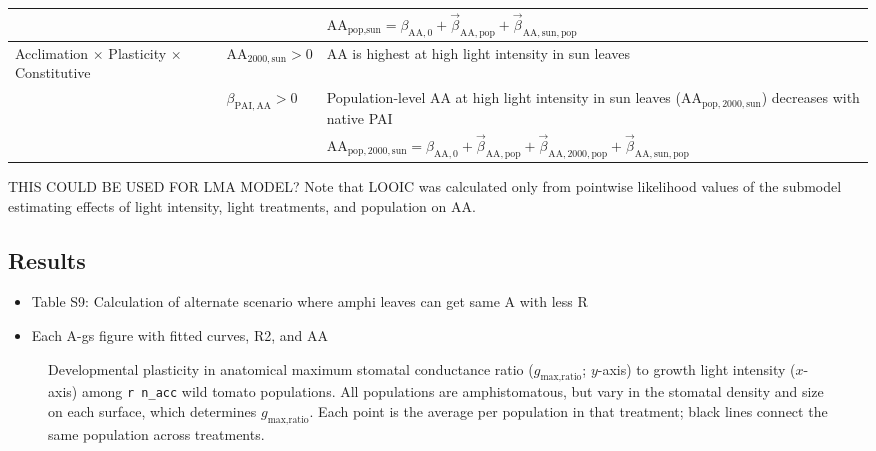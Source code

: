 \documentclass[
  letterpaper,
  DIV=11,
  numbers=noendperiod]{scrartcl}
\providecommand{\tightlist}{%
  \setlength{\itemsep}{0pt}\setlength{\parskip}{0pt}}\usepackage{longtable,booktabs,array}
\newcommand{\aax}{$\mathrm{AA}$}
\newcommand{\gmaxratio}{$g_\text{max,ratio}$}
\begin{document}
\begin{longtable}{>{\raggedright\arraybackslash}p{1in}>{\raggedright\arraybackslash}p{1.5in}>{\raggedright\arraybackslash}p{3in}}
\nopagebreak
 &  & \hspace{-1em}$\mathrm{AA}_{\text{pop},\text{sun}} = \beta_{\mathrm{AA}, 0} + \vec{\beta}_{\mathrm{AA}, \text{pop}} + \vec{\beta}_{\mathrm{AA}, \text{sun}, \text{pop}}$\\
\cmidrule{1-3}\pagebreak[0]
Acclimation $\times$ Plasticity $\times$ Constitutive & $\mathrm{AA}_{2000,\text{sun}} > 0$ & \hspace{-1em}\aax{} is highest at high light intensity in sun leaves\\
\nopagebreak
 & $\beta_{\mathrm{PAI,AA}} > 0$ & \hspace{-1em}Population-level \aax{} at high light intensity in sun leaves ($\mathrm{AA}_{\text{pop},2000,\text{sun}}$) decreases with native PAI\\
\nopagebreak
 &  & \hspace{-1em}$\mathrm{AA}_{\text{pop},2000,\text{sun}} = \beta_{\mathrm{AA}, 0} + \vec{\beta}_{\mathrm{AA}, \text{pop}} + \vec{\beta}_{\mathrm{AA}, 2000, \text{pop}} + \vec{\beta}_{\mathrm{AA}, \text{sun}, \text{pop}}$\\
\bottomrule

\end{longtable}

THIS COULD BE USED FOR LMA MODEL? Note that LOOIC was calculated only
from pointwise likelihood values of the submodel estimating effects of
light intensity, light treatments, and population on \aax{}.

\subsection{Results}\label{results}

\begin{itemize}
\tightlist
\item
  Table S9: Calculation of alternate scenario where amphi leaves can get
  same A with less R
\item
  Each A-gs figure with fitted curves, R2, and AA
\end{itemize}

\begin{figure}


\caption{\label{fig-sr-rxnorm}Developmental plasticity in anatomical
maximum stomatal conductance ratio (\gmaxratio; \(y\)-axis) to growth
light intensity (\(x\)-axis) among \texttt{r\ n\_acc} wild tomato
populations. All populations are amphistomatous, but vary in the
stomatal density and size on each surface, which determines \gmaxratio.
Each point is the average per population in that treatment; black lines
connect the same population across treatments.}

\end{figure}%
\end{document}
